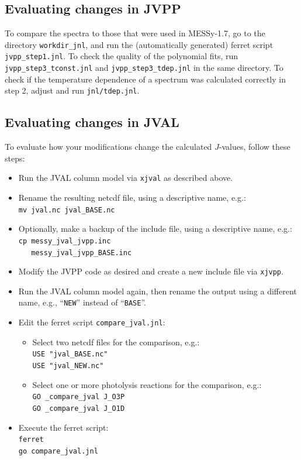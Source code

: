 \documentclass[a4paper,twoside]{article}
\def\nosep{\setlength\parsep{0mm}\setlength\topsep{0mm}\setlength\itemsep{0mm}}
\begin{document}
\subsection{Evaluating changes in JVPP}

To compare the spectra to those that were used in MESSy-1.7, go to the
directory \verb|workdir_jnl|, and run the (automatically generated)
ferret script \verb|jvpp_step1.jnl|. To check the quality of the
polynomial fits, run \verb|jvpp_step3_tconst.jnl| and
\verb|jvpp_step3_tdep.jnl| in the same directory. To check if the
temperature dependence of a spectrum was calculated correctly in step 2,
adjust and run \verb|jnl/tdep.jnl|.

\subsection{Evaluating changes in JVAL}

To evaluate how your modifications change the calculated $J$-values,
follow these steps:

\begin{itemize}\nosep
\item Run the JVAL column model via \verb|xjval| as described above.
\item Rename the resulting netcdf file, using a descriptive name, e.g.:\\
  \verb|mv jval.nc jval_BASE.nc|
\item Optionally, make a backup of the include file, using a descriptive
  name, e.g.:\\
  \verb|cp messy_jval_jvpp.inc|\\
  \verb|   messy_jval_jvpp_BASE.inc|
\item Modify the JVPP code as desired and create a new include file via
  \verb|xjvpp|.
\item Run the JVAL column model again, then rename the output using a
  different name, e.g., ``\verb|NEW|'' instead of ``\verb|BASE|''.
\item Edit the ferret script \verb|compare_jval.jnl|:
  \begin{itemize}\nosep
  \item Select two netcdf files for the comparison, e.g.:\\
    \verb|USE "jval_BASE.nc"|\\
    \verb|USE "jval_NEW.nc"|
  \item Select one or more photolysis reactions for the comparison, e.g.:\\
    \verb|GO _compare_jval J_O3P|\\
    \verb|GO _compare_jval J_O1D|
  \end{itemize}
\item Execute the ferret script:\\
  \verb|ferret|\\ 
  \verb|go compare_jval.jnl|
\end{itemize}

\end{document}

